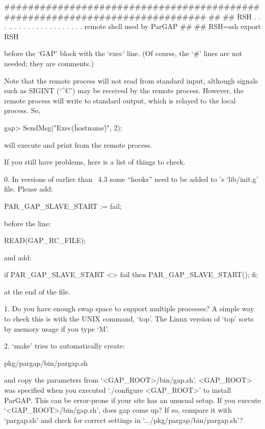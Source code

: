 \begintt
#############################################################################
##
##  RSH . . . .. . . . . . . . . . . . . . . . .  remote shell used by ParGAP
##
##
RSH=ssh
export RSH
\endtt

before the `GAP' block with the `exec' line. (Of course, the  `\#'  lines
are not needed; they are comments.)

Note that the remote {\ParGAP} process will not read from standard input,
although signals such as SIGINT (`\^{}C') may be received by  the  remote
process. However, the remote {\ParGAP} process  will  write  to  standard
output, which is relayed to the local process. So,

\beginexample
gap> SendMsg("Exec(\"hostname\")", 2);
\endexample

will execute and print from the remote process.


If you still have problems, here is a list of things to check.

\beginlist
\item{0.}
    In  versions  of  {\GAP}  earlier  than  {\GAP}~4.3  some   {\ParGAP}
    ``hooks'' need to be added to {\GAP}'s `lib/init.g' file. Please add:

\begintt
PAR_GAP_SLAVE_START := fail;
\endtt

\item{}
    before the line:

\begintt
       READ(GAP_RC_FILE);
\endtt

\item{}
    and add:

\begintt
if PAR_GAP_SLAVE_START <> fail then PAR_GAP_SLAVE_START(); fi;
\endtt

\item{}
    at the end of the file.

\item{1.}
    Do you have enough swap space to support multiple {\GAP} processes? A
    simple way to check this is with the UNIX command, `top'.  The  Linux
    version of `top' sorts by memory usage if you type `M'.

\item{2.}
   `make' tries to automatically create:

\begintt
pkg/pargap/bin/pargap.sh
\endtt
       
\item{}
    and copy the parameters from `<GAP_ROOT>/bin/gap.sh'. <GAP_ROOT>  was
    specified when  you  executed  `./configure  <GAP_ROOT>'  to  install
    ParGAP. This can be error-prone if your site has an unusual setup. If
    you execute `<GAP_ROOT>/bin/gap.sh', does gap come up? If so, compare
    it   with   `pargap.sh'   and   check   for   correct   settings   in
    `.../pkg/pargap/bin/pargap.sh'?

